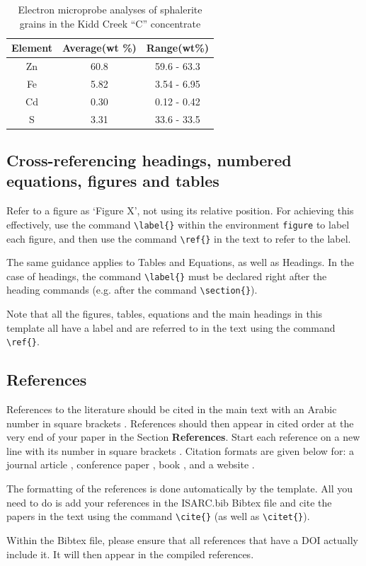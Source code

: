 \documentclass[a4paper, 10pt, twocolumn, twoside]{article}
\begin{document}
\begin{table}[!htb]
    \centering
    \caption{Electron microprobe analyses of sphalerite grains in the Kidd Creek ``C'' concentrate}
    \label{tab_1}
    \begin{tabular}{ccc}
    \hline
    Element & Average(wt \%) & Range(wt\%)\\
    \hline
    Zn	&60.8	&59.6 - 63.3\\
    Fe	&5.82	&3.54 - 6.95\\
    Cd	&0.30	&0.12 - 0.42\\
    S	&3.31	&33.6 - 33.5\\
    \hline
    \end{tabular}
\end{table}


\subsection{Cross-referencing headings, numbered equations, figures and tables}

Refer to a figure as `Figure X', not using its relative position.
For achieving this effectively, use the command \verb|\label{}| within the environment \verb|figure| to label each figure, and then use the command \verb|\ref{}| in the text to refer to the label.

The same guidance applies to Tables and Equations, as well as Headings.
In the case of headings, the command \verb|\label{}| must be declared right after the heading commands (e.g. after the command \verb|\section{}|).

Note that all the figures, tables, equations and the main headings in this template all have a label and are referred to in the text using the command \verb|\ref{}|.


\subsection{References}

References to the literature should be cited in the main text with an Arabic number in square brackets \cite{Ha_2012}. 
References should then appear in cited order at the very end of your paper in the Section \textbf{References}. 
Start each reference on a new line with its number in square brackets \cite{Ha_2012}. 
Citation formats are given below for: a journal article \cite{Ha_2012}, conference paper \cite{Kwok_2012}, book \cite{Book}, and a website \cite{Website}.

The formatting of the references is done automatically by the  template.
All you need to do is add your references in the ISARC.bib Bibtex file and cite the papers in the text using the command \verb|\cite{}| (as well as \verb|\citet{}|).

Within the Bibtex file, please ensure that all references that have a DOI actually include it. It will then appear in the compiled references.




\end{document}
